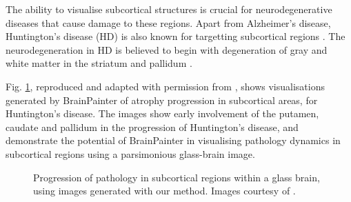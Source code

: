 \documentclass{llncs}
\begin{document}
The ability to visualise subcortical structures is crucial for neurodegenerative diseases that cause damage to these regions. Apart from Alzheimer's disease, Huntington's disease (HD) is also known for targetting subcortical regions \cite{douaud2009vivo,wijeratne2018image}. The neurodegeneration in HD is believed to begin with degeneration of gray and white matter in the striatum and pallidum \cite{douaud2009vivo}.

Fig. \ref{fig:peter}, reproduced and adapted with permission from \cite{wijeratne2018image}, shows visualisations generated by BrainPainter of atrophy progression in subcortical areas, for Huntington's disease. The images show early involvement of the putamen, caudate and pallidum in the progression of Huntington's disease, and demonstrate the potential of BrainPainter in visualising pathology dynamics in subcortical regions using a parsimonious glass-brain image.


\begin{figure}[htp]
\centering
 \caption{Progression of pathology in subcortical regions within a glass brain, using images generated with our method. Images courtesy of \cite{wijeratne2018image}.}
   \label{fig:peter}
\end{figure}
\end{document}
